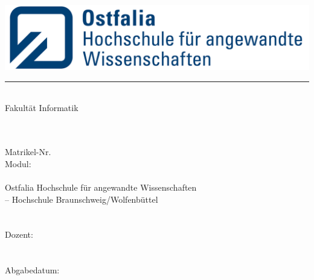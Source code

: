 
\begin{titlepage}

    
    \begin{flushleft}
    \includegraphics[scale=0.9]{Bilder/ostfalia_logo_left.png}\\
    \color{strich} 
    \hspace{24mm}\rule{70mm}{0.25mm}\\
    \hspace{24mm}\Large
    \textsf{Fakultät Informatik}
    \end{flushleft}
    
    \begin{flushleft}
         \vspace{3em}
        {
            \color{text}\fontsize{21}{20}{\textsf{\documenttitle}}}\\
            \vspace{6em}
            {\large\textsf{\textbf{\documentname}}}\\
            {\small\textsf{Matrikel-Nr. \documentmanr}}\\
        \vspace{3em}
        {\color{black}\large\textsf{Modul: \documentmodul\\
        \ \\
        Ostfalia Hochschule für angewandte Wissenschaften\\
        – Hochschule Braunschweig/Wolfenbüttel\\
        \color{strich}
        \hrulefill\\
        \ \\\color{black}
        Dozent: \dozent \\
        \ \\
        \ \\
        Abgabedatum: \einreichungsdatum
        }}
        

\end{flushleft}
\end{titlepage}
